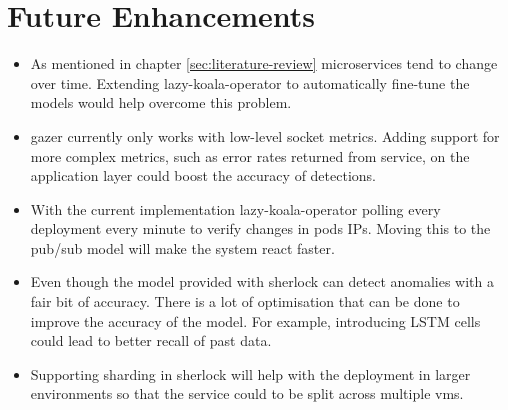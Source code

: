 \section{Future Enhancements}

\begin{itemize}[noitemsep,nolistsep]
    \item As mentioned in chapter \ref{sec:literature-review} microservices tend to change over time. Extending \ac{lazy-koala-operator} to automatically fine-tune the models would help overcome this problem.
    \item \ac{gazer} currently only works with low-level socket metrics. Adding support for more complex metrics, such as error rates returned from service, on the application layer could boost the accuracy of detections.
    \item With the current implementation \ac{lazy-koala-operator} polling every deployment every minute to verify changes in pods IPs. Moving this to the pub/sub model will make the system react faster.
    \item Even though the model provided with \ac{sherlock} can detect anomalies with a fair bit of accuracy. There is a lot of optimisation that can be done to improve the accuracy of the model. For example, introducing LSTM cells could lead to better recall of past data.
    \item Supporting sharding in \ac{sherlock} will help with the deployment in larger environments so that the service could to be split across multiple \acp{vm}.
\end{itemize}